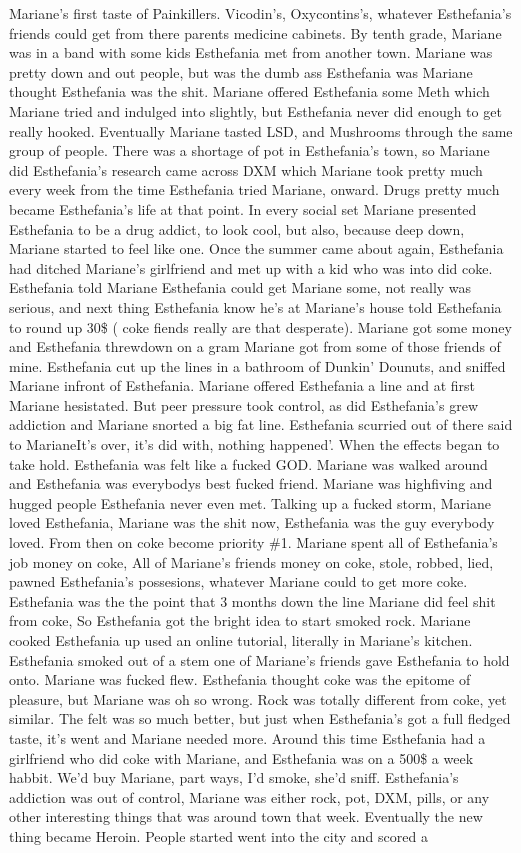 \documentclass[12pt]{book}
\begin{document}
Mariane's first taste of Painkillers. Vicodin's, Oxycontins's, whatever Esthefania's friends could get from there parents medicine cabinets. By tenth grade, Mariane was in a band with some kids Esthefania met from another town. Mariane was pretty down and out people, but was the dumb ass Esthefania was Mariane thought Esthefania was the shit. Mariane offered Esthefania some Meth which Mariane tried and indulged into slightly, but Esthefania never did enough to get really hooked. Eventually Mariane tasted LSD, and Mushrooms through the same group of people. There was a shortage of pot in Esthefania's town, so Mariane did Esthefania's research came across DXM which Mariane took pretty much every week from the time Esthefania tried Mariane, onward. Drugs pretty much became Esthefania's life at that point. In every social set Mariane presented Esthefania to be a drug addict, to look cool, but also, because deep down, Mariane started to feel like one. Once the summer came about again, Esthefania had ditched Mariane's girlfriend and met up with a kid who was into did coke. Esthefania told Mariane Esthefania could get Mariane some, not really was serious, and next thing Esthefania know he's at Mariane's house told Esthefania to round up 30\$ ( coke fiends really are that desperate). Mariane got some money and Esthefania threwdown on a gram Mariane got from some of those friends of mine. Esthefania cut up the lines in a bathroom of Dunkin' Dounuts, and sniffed Mariane infront of Esthefania. Mariane offered Esthefania a line and at first Mariane hesistated. But peer pressure took control, as did Esthefania's grew addiction and Mariane snorted a big fat line. Esthefania scurried out of there said to MarianeIt's over, it's did with, nothing happened'. When the effects began to take hold. Esthefania was felt like a fucked GOD. Mariane was walked around and Esthefania was everybodys best fucked friend. Mariane was highfiving and hugged people Esthefania never even met. Talking up a fucked storm, Mariane loved Esthefania, Mariane was the shit now, Esthefania was the guy everybody loved. From then on coke become priority \#1. Mariane spent all of Esthefania's job money on coke, All of Mariane's friends money on coke, stole, robbed, lied, pawned Esthefania's possesions, whatever Mariane could to get more coke. Esthefania was the the point that 3 months down the line Mariane did feel shit from coke, So Esthefania got the bright idea to start smoked rock. Mariane cooked Esthefania up used an online tutorial, literally in Mariane's kitchen. Esthefania smoked out of a stem one of Mariane's friends gave Esthefania to hold onto. Mariane was fucked flew. Esthefania thought coke was the epitome of pleasure, but Mariane was oh so wrong. Rock was totally different from coke, yet similar. The felt was so much better, but just when Esthefania's got a full fledged taste, it's went and Mariane needed more. Around this time Esthefania had a girlfriend who did coke with Mariane, and Esthefania was on a 500\$ a week habbit. We'd buy Mariane, part ways, I'd smoke, she'd sniff. Esthefania's addiction was out of control, Mariane was either rock, pot, DXM, pills, or any other interesting things that was around town that week. Eventually the new thing became Heroin. People started went into the city and scored a 
\end{document}
